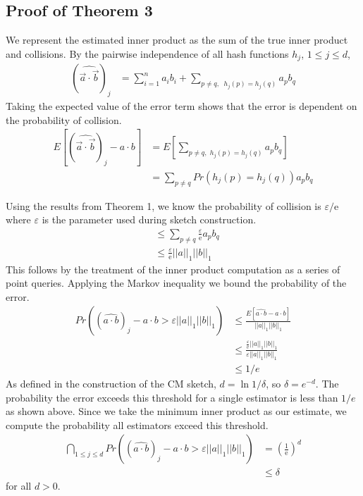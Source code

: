 \documentclass[11pt]{article}
\begin{document}
	\subsection{Proof of Theorem 3}
		We represent the estimated inner product as the sum of the true inner product and collisions. By the pairwise independence of all hash functions $h_j$, $1 \leq j \leq d$,
		\begin{align}
		(\widehat{\vec a \cdot \vec b})_j &= \sum_{i=1}^n a_ib_i + \sum_{p \neq q, \,\,\ h_j(p)=h_j(q)} a_pb_q
        \end{align}
        Taking the expected value of the error term shows that the error is dependent on the probability of collision.
        \begin{align}
		E\left[(\widehat{\vec a \cdot \vec b})_j - a \cdot b\right] &= E\left[\sum_{p \neq q, \,\, h_j(p)=h_j(q)} a_pb_q\right] \\
		&= \sum_{p \neq q}Pr(h_j(p) = h_j(q))a_pb_q
        \end{align}

        Using the results from Theorem 1, we know the probability of collision is $\varepsilon/\mathrm e$ where $\varepsilon$ is the parameter used during sketch construction.
        \begin{align}
		&\leq \sum_{p \neq q} \frac{\varepsilon}{\mathrm{e}}a_pb_q \\
		&\leq \frac{\varepsilon}{\mathrm e}||a||_1||b||_1
		\end{align}
		This follows by the treatment of the inner product computation as a series of point queries. Applying the Markov inequality we bound the probability of the error.
		\begin{align}
		Pr((\widehat{a \cdot b})_j - a \cdot b > \varepsilon ||a||_1||b||_1) &\leq \frac{E[\widehat{a \cdot b} - a \cdot b]}{||a||_1||b||_1} \\
		&\leq \frac{\frac{\varepsilon}{\mathrm e}||a||_1||b||_1}{\varepsilon||a||_1||b||_1} \\
		& \leq 1/e
        \end{align}
        As defined in the construction of the CM sketch, $d = \ln 1/\delta$, so $\delta = e^{-d}$. The probability the error exceeds this threshold for a single estimator is less than $1/e$ as shown above. Since we take the minimum inner product as our estimate, we compute the probability all estimators exceed this threshold.
        \begin{align}
        \bigcap_{1\leq j \leq d} Pr((\widehat{a \cdot b})_j - a \cdot b > \varepsilon ||a||_1||b||_1) &= \left(\frac{1}{\mathrm e}\right)^d \\
        &\leq \delta
        \end{align}
        for all $d > 0$.
\end{document}
